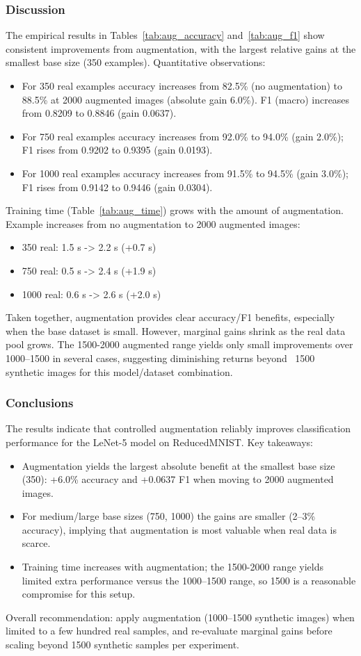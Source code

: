 \subsubsection{Discussion}
The empirical results in Tables~\ref{tab:aug_accuracy} and~\ref{tab:aug_f1} show consistent improvements from augmentation, with the largest relative gains at the smallest base size (350 examples). Quantitative observations:
\begin{itemize}
    \item For 350 real examples accuracy increases from 82.5\% (no augmentation) to 88.5\% at 2000 augmented images (absolute gain 6.0\%). F1 (macro) increases from 0.8209 to 0.8846 (gain 0.0637).
    \item For 750 real examples accuracy increases from 92.0\% to 94.0\% (gain 2.0\%); F1 rises from 0.9202 to 0.9395 (gain 0.0193).
    \item For 1000 real examples accuracy increases from 91.5\% to 94.5\% (gain 3.0\%); F1 rises from 0.9142 to 0.9446 (gain 0.0304).
\end{itemize}

Training time (Table~\ref{tab:aug_time}) grows with the amount of augmentation. Example increases from no augmentation to 2000 augmented images:
\begin{itemize}
    \item 350 real: 1.5 s -> 2.2 s (+0.7 s)
    \item 750 real: 0.5 s -> 2.4 s (+1.9 s)
    \item 1000 real: 0.6 s -> 2.6 s (+2.0 s)
\end{itemize}

Taken together, augmentation provides clear accuracy/F1 benefits, especially when the base dataset is small. However, marginal gains shrink as the real data pool grows. The 1500-2000 augmented range yields only small improvements over 1000--1500 in several cases, suggesting diminishing returns beyond ~1500 synthetic images for this model/dataset combination.

\subsubsection{Conclusions}
The results indicate that controlled augmentation reliably improves classification performance for the LeNet-5 model on ReducedMNIST. Key takeaways:
\begin{itemize}
    \item Augmentation yields the largest absolute benefit at the smallest base size (350): +6.0\% accuracy and +0.0637 F1 when moving to 2000 augmented images.
    \item For medium/large base sizes (750, 1000) the gains are smaller (2--3\% accuracy), implying that augmentation is most valuable when real data is scarce.
    \item Training time increases with augmentation; the 1500-2000 range yields limited extra performance versus the 1000--1500 range, so 1500 is a reasonable compromise for this setup.
\end{itemize}

Overall recommendation: apply augmentation (1000--1500 synthetic images) when limited to a few hundred real samples, and re-evaluate marginal gains before scaling beyond 1500 synthetic samples per experiment.

